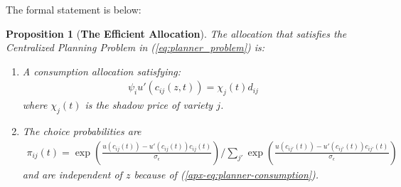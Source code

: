 \documentclass[12pt,pdftex]{article}
\newtheorem{prp}{Proposition}
\begin{document}
\begin{onehalfspacing}
The formal statement is below:
\begin{prp}[\textbf{The Efficient Allocation}]\label{apx-prp:efficient-allocation} The allocation that satisfies the Centralized Planning Problem in (\ref{eq:planner_problem}) is:
\begin{enumerate}
\item A consumption allocation satisfying:
\begin{align}
\psi_{i} u'(c_{ij}(z,t) ) = \chi_{j}(t) d_{ij}
\label{apx-eq:planner-consumption}
\end{align}
where $\chi_{j}(t)$ is the shadow price of variety $j$.
\item The choice probabilities are
\begin{align}
\pi_{ij}(t) =\exp \left( \frac{u(c_{ij}(t)) - u'(c_{ij}(t))c_{ij}(t)}{\sigma_{\epsilon}}\right) \bigg / \sum_{j'}\exp \left( \frac{u(c_{ij'}(t)) - u'(c_{ij'}(t))c_{ij'}(t)}{\sigma_{\epsilon}} \right)
\label{apx-eq:planner-choice-prob}
\end{align}
and are independent of $z$ because of (\ref{apx-eq:planner-consumption}).
\end{enumerate}
\end{prp}


\end{onehalfspacing}
\end{document}
